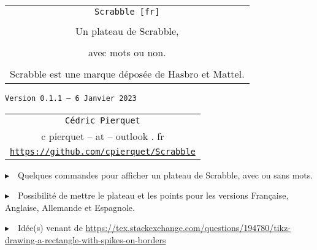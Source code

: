 \documentclass{article}
\def\TPversion{0.1.1}
\def\TPdate{6 Janvier 2023}
\begin{document}
\pagestyle{fancy}

\thispagestyle{empty}

\vspace{2cm}

\begin{center}
	\begin{minipage}{0.75\linewidth}
	\begin{tcolorbox}[colframe=yellow,colback=yellow!15]
		\begin{center}
			\begin{tabular}{c}
				{\Huge \texttt{Scrabble [fr]}}\\
				\\
				{\LARGE Un plateau de Scrabble,} \\
				\\
				{\LARGE avec mots ou non.} \\
				\\
				{Scrabble\texttrademark{} est une marque déposée de Hasbro\texttrademark{} et Mattel\texttrademark{}.}
			\end{tabular}
			
			\medskip
			
			{\small \texttt{Version \TPversion{} -- \TPdate}}
		\end{center}
	\end{tcolorbox}
\end{minipage}
\end{center}

\vspace{0.5cm}

\begin{center}
	\begin{tabular}{c}
	\texttt{Cédric Pierquet}\\
	{\ttfamily c pierquet -- at -- outlook . fr}\\
	\texttt{\url{https://github.com/cpierquet/Scrabble}}
\end{tabular}
\end{center}

\vspace{0.5cm}

{$\blacktriangleright$~~Quelques commandes pour afficher un plateau de Scrabble, avec ou sans mots.}

\smallskip

{$\blacktriangleright$~~Possibilité de mettre le plateau et les points pour les versions Française, Anglaise, Allemande et Espagnole.}

\smallskip

{$\blacktriangleright$~~Idée(s) venant de \url{https://tex.stackexchange.com/questions/194780/tikz-drawing-a-rectangle-with-spikes-on-borders}}
\end{document}

